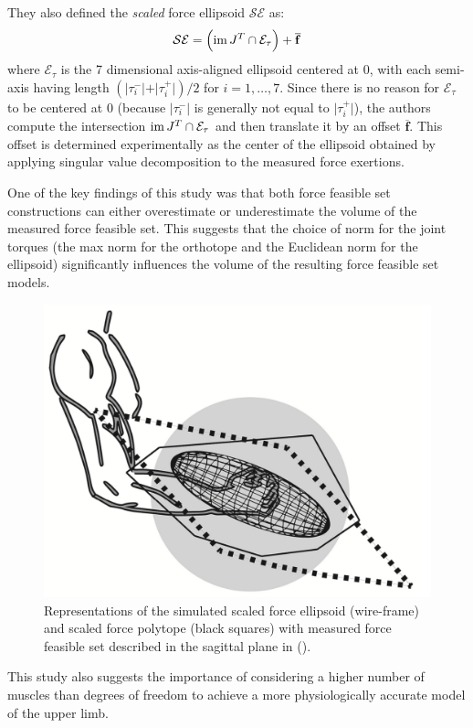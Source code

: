 They also defined the \emph{scaled} force ellipsoid $\mathcal{SE}$ as:
\begin{align*}
    \mathcal{SE} = \left(\operatorname{im}{J^T} \cap \mathcal{E}_{\tau}\right) + \overline{\mathbf{f}}
\end{align*}
where $\mathcal{E}_{\tau}$ is the 7 dimensional axis-aligned ellipsoid centered at $0$, with each semi-axis having length $(\vert \tau_i^-\vert + \vert \tau_i^+ \vert)/2$ for $i=1,\dots, 7$. Since there is no reason for $\mathcal{E}_{\tau}$ to be centered at 0 (because $\vert \tau_i^-\vert$ is generally not equal to $\vert \tau_i^+\vert$), the authors compute the intersection $\operatorname{im}{J^T}\cap \mathcal{E}_{\tau}$ and then translate it by an offset $\overline{\mathbf{f}}$. This offset is determined experimentally as the center of the ellipsoid obtained by applying singular value decomposition to the measured force exertions.

One of the key findings of this study was that both force feasible set constructions can either overestimate or underestimate the volume of the measured force feasible set. This suggests that the choice of norm for the joint torques (the max norm for the orthotope and the Euclidean norm for the ellipsoid) significantly influences the volume of the resulting force feasible set models.
\begin{figure}[!htb]
    \captionsetup{justification=centering}
        \centering
        \includegraphics[trim={0 0 0 0},clip,width=0.4\linewidth]{img/chapter_1/rezzoug_2021.png}
    \caption{Representations of the simulated scaled force ellipsoid (wire-frame) and scaled force polytope (black squares) with measured force feasible set described in the sagittal plane in (\cite{rezzougUpperLimbIsometricForce2021b}).}
    \label{fig:rezzoug2021}
\end{figure}

This study also suggests the importance of considering a higher number of muscles than degrees of freedom to achieve a more physiologically accurate model of the upper limb.

